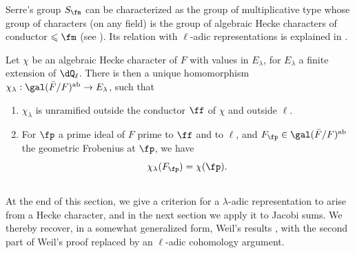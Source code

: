 Serre's group $S_\fm$ can be characterized as the 
group of multiplicative type whose group of characters (on any 
field) is the group of algebraic Hecke characters of conductor 
$\leqslant \fm$ (see ). Its relation with 
$\ell$-adic representations is explained in .





\begin{theorem_}\label{VI:5-8}
Let $\chi$ be an algebraic Hecke character of $F$ with values in $E_\lambda$, for 
$E_\lambda$ a finite extension of $\dQ_\ell$. There is then a unique 
  homomorphism $\chi_\lambda:\gal(\bar F/F)^\textnormal{ab} \to E_\lambda$, such 
that 
\begin{enumerate}[\indent (i)]
  \item $\chi_\lambda$ is unramified outside the conductor $\ff$ of 
    $\chi$ and outside $\ell$. 
  \item For $\fp$ a prime ideal of $F$ prime to $\ff$ and to $\ell$, 
    and $F_\fp\in \gal(\bar F/F)^\textnormal{ab}$ the geometric Frobenius 
    at $\fp$, we have 
    \[
      \chi_\lambda(F_\fp) = \chi(\fp) \text{.}
    \] 
\end{enumerate}
\end{theorem_}





\subsection{}\label{VI:5-9}

At the end of this section, we give a criterion for a 
$\lambda$-adic representation to arise from a Hecke character, 
and in the next section we apply it to Jacobi sums. We 
thereby recover, in a somewhat generalized form, Weil's results 
, with the second part of Weil's proof 
replaced by an $\ell$-adic cohomology argument. 





